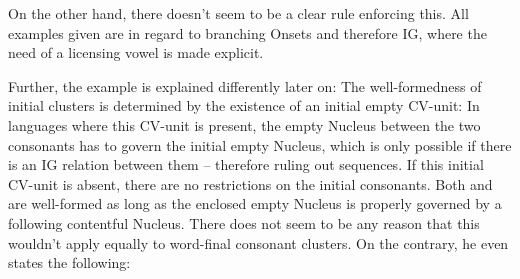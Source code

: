 
On the other hand, there doesn't seem to be a clear rule enforcing this.
All examples given are in regard to branching Onsets and therefore \gls{IG},
where the need of a licensing vowel is made explicit.

Further, the  example is explained differently later on:
The well-formedness of initial  clusters is determined by the existence
of an initial empty CV-unit:
In languages where this CV-unit is present, the empty Nucleus between the two consonants
has to govern the initial empty Nucleus, which is only possible if there is
an \gls{IG} relation between them -- therefore ruling out  sequences.
If this initial CV-unit is absent, there are no restrictions on the initial consonants.
Both  and  are well-formed as long as the enclosed empty Nucleus
is properly governed by a following contentful Nucleus.
There does not seem to be any reason that this wouldn't apply equally to word-final
consonant clusters. On the contrary, he even states the following:
